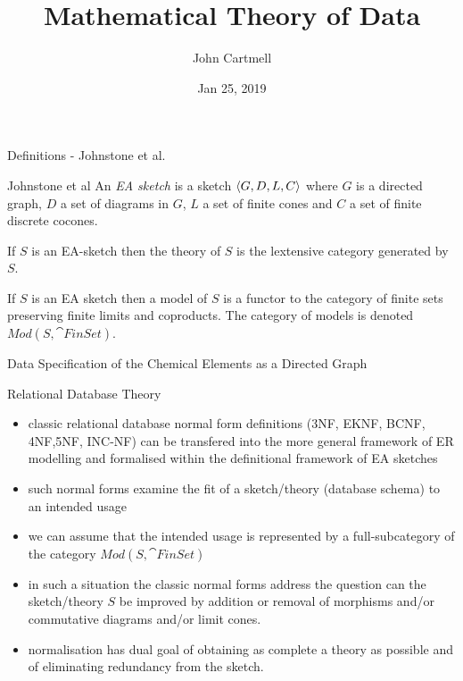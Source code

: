 \documentclass[xcolor=pst,dvips]{beamer}
\title[John Cartmell]{Mathematical Theory of Data}
\author{John Cartmell}
\institute{Ad Otium}
\date{Jan 25, 2019}
\begin{document}
\newcommand{\attr}[1]{#1}
\renewcommand{\attr}[1]{\psframebox[linecolor=red,framearc=.1]{#1}}
\newcommand{\attrtype}[1]{#1}
\renewcommand{\attrtype}[1]{\psframebox[linecolor=blue,framearc=.1]{#1}}
\newcommand{\etype}[1]{#1}
\renewcommand{\etype}[1]{\psframebox[linecolor=red,framearc=.1]{#1}}

\newcommand{\CEsymboltype}[0]{varchar(2)}
\newcommand{\CEatomicnumbertype}{number(1,1000)}
\newcommand{\CEfloattype}{float}
\newcommand{\CEnametype}{varchar(64)}
\newcommand{\CEvalencynumbertype}{number(-7,7)}


\begin{frame}
\titlepage
\end{frame}



\begin{frame}{Definitions - Johnstone et al.}
\begin{definition}{Johnstone et al}
An \textit{EA sketch} is a sketch $\langle G,D,L,C\rangle$ where $G$ is a directed graph, $D$ a set of diagrams in $G$, $L$ a set of finite cones and
$C$ a set of finite discrete cocones.
\end{definition}


If $S$ is an EA-sketch then the theory of $S$ is the lextensive category generated by $S$.

If $S$ is an EA sketch then a model of $S$ is a functor to the category of finite sets preserving finite limits and coproducts.
The category of models is denoted $Mod(S,\cat{FinSet})$.
\end{frame}

\begin{frame}{Data Specification of the Chemical Elements as a Directed Graph}
\scalebox{0.65}{

} 
\end{frame}

\begin{frame}{Relational Database Theory}
\begin{itemize}
\item classic relational database normal form definitions ({\scriptsize 3NF, EKNF, BCNF, 4NF,5NF, INC-NF}) can be transfered into the more general framework
of ER modelling and formalised within the definitional framework of EA sketches

\item such normal forms  examine the fit of a sketch/theory (database schema) to an intended usage

\item we can assume that the intended usage is represented by a full-subcategory of the category $Mod(S,\cat{FinSet})$

\item in such a situation the classic normal forms address the question can the sketch/theory $S$ be improved by addition or removal of morphisms and/or commutative diagrams and/or limit cones.
\item normalisation has dual goal of obtaining as complete a theory as possible and of eliminating redundancy from the sketch.  
\end{itemize}
\end{frame}
\end{document}
